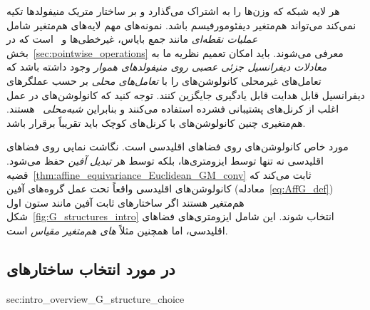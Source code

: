 هر لایه شبکه که وزن‌ها را به اشتراک می‌گذارد و بر ساختار متریک منیفولدها تکیه نمی‌کند می‌تواند هم‌متغیر دیفئومورفیسم باشد.
نمونه‌های مهم لایه‌های هم‌متغیر  شامل \emph{عملیات نقطه‌ای} مانند جمع بایاس، غیرخطی‌ها و \onexonefarsi\ است که در بخش~\ref{sec:pointwise_operations} معرفی می‌شوند.
باید امکان تعمیم نظریه ما به \emph{معادلات دیفرانسیل جزئی عصبی روی منیفولدهای هموار} وجود داشته باشد که تعامل‌های غیرمحلی کانولوشن‌های \lr{$\GM$} را با \emph{تعامل‌های محلی} بر حسب عملگرهای دیفرانسیل قابل هدایت  قابل یادگیری جایگزین کنند.
توجه کنید که کانولوشن‌های \lr{$\GM$} در عمل اغلب از کرنل‌های پشتیبانی فشرده استفاده می‌کنند و بنابراین \emph{شبه‌محلی}~\cite{tomboulis2015nonlocal} هستند.
هم‌متغیری  چنین کانولوشن‌های \lr{$\GM$} با کرنل‌های کوچک باید تقریباً برقرار باشد.


مورد خاص کانولوشن‌های \lr{$\GM$} روی فضاهای اقلیدسی است.
نگاشت نمایی روی فضاهای اقلیدسی نه تنها توسط ایزومتری‌ها، بلکه توسط هر \emph{تبدیل آفین} حفظ می‌شود.
قضیه~\ref{thm:affine_equivariance_Euclidean_GM_conv} ثابت می‌کند که کانولوشن‌های \lr{$\GM$} اقلیدسی واقعاً تحت عمل گروه‌های آفین  (معادله~\eqref{eq:AffG_def}) هم‌متغیر هستند اگر ساختارهای  ثابت آفین مانند ستون اول شکل~\ref{fig:G_structures_intro} انتخاب شوند.
این شامل ایزومتری‌های  فضاهای اقلیدسی، اما همچنین مثلاً \emph{های هم‌متغیر مقیاس} است.



















\toclesslab\subsection{در مورد انتخاب ساختارهای }{sec:intro_overview_G_structure_choice}

